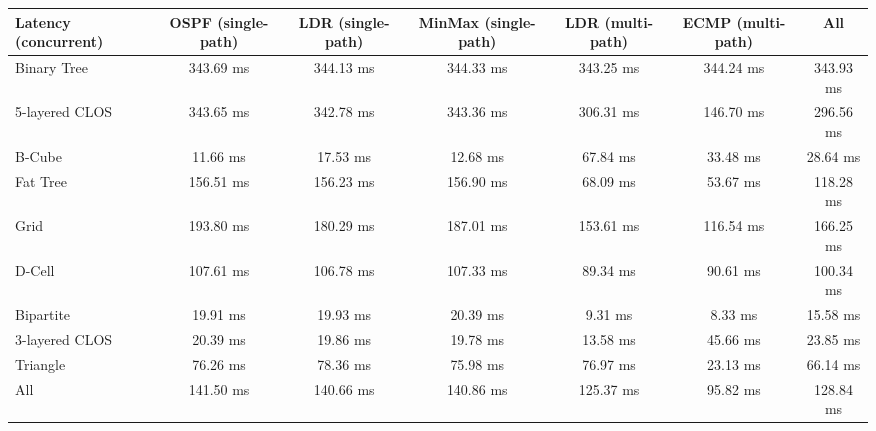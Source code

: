\begin{tabular}{l|cccccc}
Latency (concurrent) & OSPF (single-path) & LDR (single-path) & MinMax (single-path) & LDR (multi-path) & ECMP (multi-path) & All       \\
\hline
Binary Tree          & 343.69 ms          & 344.13 ms         & 344.33 ms            & 343.25 ms        & 344.24 ms         & 343.93 ms \\
5-layered CLOS       & 343.65 ms          & 342.78 ms         & 343.36 ms            & 306.31 ms        & 146.70 ms         & 296.56 ms \\
B-Cube               & 11.66 ms           & 17.53 ms          & 12.68 ms             & 67.84 ms         & 33.48 ms          & 28.64 ms  \\
Fat Tree             & 156.51 ms          & 156.23 ms         & 156.90 ms            & 68.09 ms         & 53.67 ms          & 118.28 ms \\
Grid                 & 193.80 ms          & 180.29 ms         & 187.01 ms            & 153.61 ms        & 116.54 ms         & 166.25 ms \\
D-Cell               & 107.61 ms          & 106.78 ms         & 107.33 ms            & 89.34 ms         & 90.61 ms          & 100.34 ms \\
Bipartite            & 19.91 ms           & 19.93 ms          & 20.39 ms             & 9.31 ms          & 8.33 ms           & 15.58 ms  \\
3-layered CLOS       & 20.39 ms           & 19.86 ms          & 19.78 ms             & 13.58 ms         & 45.66 ms          & 23.85 ms  \\
Triangle             & 76.26 ms           & 78.36 ms          & 75.98 ms             & 76.97 ms         & 23.13 ms          & 66.14 ms  \\
All                  & 141.50 ms          & 140.66 ms         & 140.86 ms            & 125.37 ms        & 95.82 ms          & 128.84 ms \\
\end{tabular}